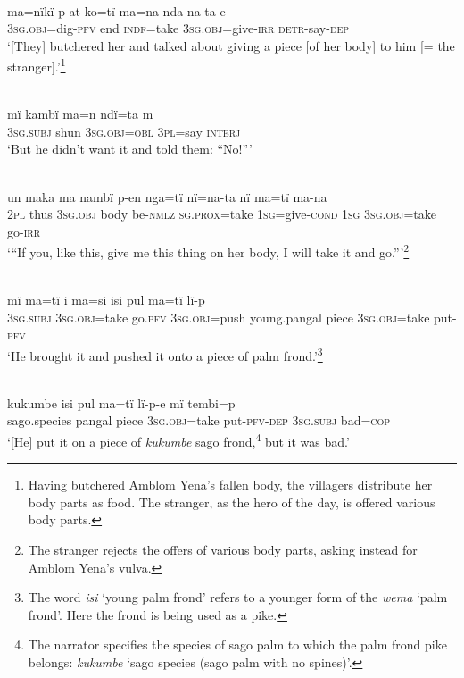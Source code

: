 \\
\gll ma=nïkï-p      at  ko=tï    ma=na-nda    na-ta-e\\
3\textsc{sg.obj}=dig{}-\textsc{pfv}  end  \textsc{indf}=take  3\textsc{sg.obj}=give-\textsc{irr}  \textsc{detr-}say-\textsc{dep}\\
\glt ‘[They] butchered her and talked about giving a piece [of her body] to him [= the stranger].’\footnote{Having butchered Amblom Yena’s fallen body, the villagers distribute her body parts as food. The stranger, as the hero of the day, is offered various body parts.}

\\
\gll mï      kambï  ma=n      ndï=ta    m\\
3\textsc{sg.subj}  shun  3\textsc{sg.obj=obl}  3\textsc{pl}=say  \textsc{interj}\\
\glt ‘But he didn’t want it and told them: “No!”’

\\
\gll un  maka   ma      nambï  p-en    nga=tï      nï=na-ta nï    ma=tï    ma-na\\
2\textsc{pl}  thus  3\textsc{sg.obj}  body  be-\textsc{nmlz}  \textsc{sg.prox}=take  1\textsc{sg}=give-\textsc{cond} 1\textsc{sg}  \textsc{3sg.obj}=take  go-\textsc{irr}\\
\glt ‘“If you, like this, give me this thing on her body, I will take it and go.”’\footnote{The stranger rejects the offers of various body parts, asking instead for Amblom Yena’s vulva.}

\newpage

\\
\gll mï      ma=tï      i    ma=si      isi        pul ma=tï      lï-p\\
3\textsc{sg.subj}  3\textsc{sg.obj}=take  go.\textsc{pfv}  3\textsc{sg.obj}=push  young.pangal  piece 3\textsc{sg.obj}=take  put-\textsc{pfv}\\
\glt ‘He brought it and pushed it onto a piece of palm frond.’\footnote{The word \textit{isi} ‘young palm frond’ refers to a younger form of the \textit{wema} ‘palm frond’. Here the frond is being used as a pike.}

\\
\gll kukumbe  isi    pul    ma=tï      lï-p-e       mï      tembi=p\\
sago.species  pangal  piece  3\textsc{sg.obj}=take  put-\textsc{pfv-dep}  3\textsc{sg.subj}  bad=\textsc{cop}\\
\glt ‘[He] put it on a piece of \textit{kukumbe} sago frond,\footnote{The narrator specifies the species of sago palm to which the  palm frond pike belongs: \textit{kukumbe} ‘sago species (sago palm with no spines)’.} but it was bad.’

